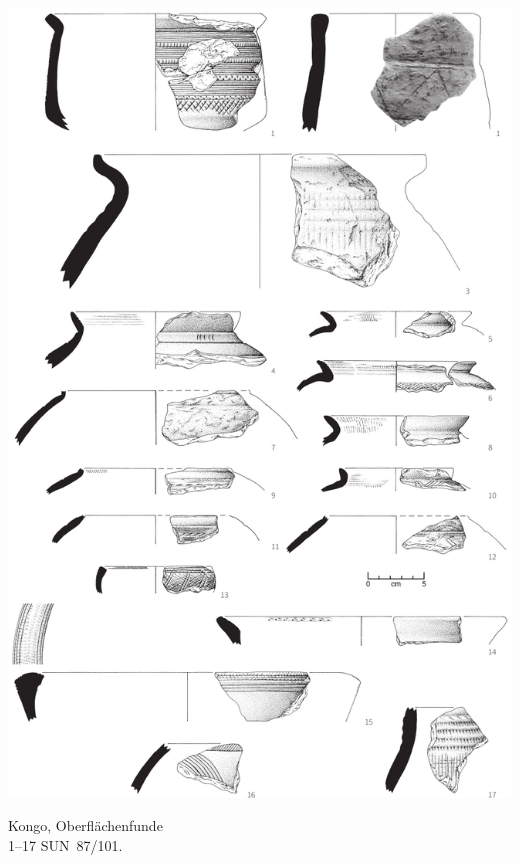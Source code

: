 \begin{pl}[H]
	\includegraphics{plt/Taf32.pdf}
	\vspace{.75em}\caption{Kongo, Oberflächenfunde \\ 1--17 SUN~87/101.}
	\label{pl:32}
\end{pl}

